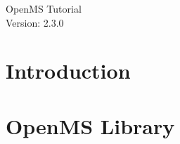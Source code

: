 \documentclass[a4paper]{article}
\newcommand{\+}{\discretionary{\mbox{\scriptsize$\hookleftarrow$}}{}{}}
\begin{document}
\begin{titlepage}
\vspace*{7cm}
\begin{center}
{\Large OpenMS Tutorial\\[1ex]\large Version: 2.3.0 }\\
\end{center}
\end{titlepage}


\setcounter{tocdepth}{2}
\tableofcontents
\pagebreak

\section{Introduction}

	
	\pagebreak
	
	\pagebreak
	
	\pagebreak
	


\pagebreak
\section{OpenMS Library}

	
	\pagebreak
	
	\pagebreak
	
	\pagebreak
	
	\pagebreak
	
	\pagebreak
	
	\pagebreak
	
	\pagebreak
	
	\pagebreak
	
	\pagebreak
	
\end{document}
